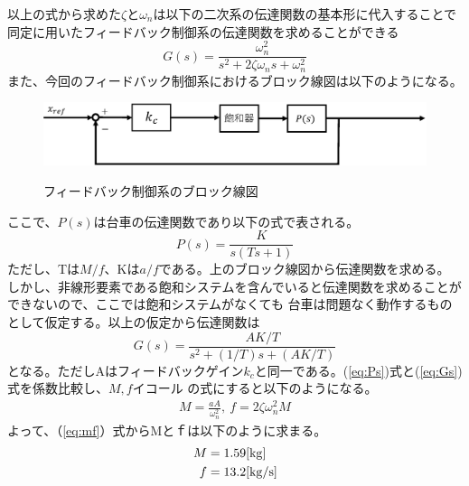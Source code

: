 		以上の式から求めた$\zeta$と$\omega_{n}$は以下の二次系の伝達関数の基本形に代入することで
		同定に用いたフィードバック制御系の伝達関数を求めることができる
		\begin{equation}
			G(s) = \frac{\omega_{n}^{2}}{s^{2}+2\zeta\omega_{n}s + \omega_{n}^{2}}
		\end{equation}
		また、今回のフィードバック制御系におけるブロック線図は以下のようになる。
		\begin{figure}[H]
			\centering
			\includegraphics[width=1.0\linewidth]{gazo/FeedBackCart.eps}\\
			\caption{フィードバック制御系のブロック線図}
			\label{image:FeedBackCart}
		\end{figure}
		ここで、$P(s)$は台車の伝達関数であり以下の式で表される。
		\begin{equation}
			P(s)=\frac{K}{s(Ts+1)}
			\label{eq:Ps}
		\end{equation}
		ただし、Tは$M/f$、Kは$a/f$である。上のブロック線図から伝達関数を求める。
		しかし、非線形要素である飽和システムを含んでいると伝達関数を求めることができないので、ここでは飽和システムがなくても
		台車は問題なく動作するものとして仮定する。以上の仮定から伝達関数は
		\begin{equation}
			G(s) = \frac{AK/T}{s^{2}+(1/T)s+(AK/T)}
			\label{eq:Gs}
		\end{equation}
		となる。ただしAはフィードバックゲイン$k_c$と同一である。(\ref{eq:Ps})式と(\ref{eq:Gs})式を係数比較し、$M,f$イコール
		の式にすると以下のようになる。
		\begin{equation}
			\left.
			\begin{array}{l}
				\displaystyle M=\frac{aA}{\omega_{n}^{2}} , \ f=2\zeta\omega_{n}^{2}M
			\end{array}
			\right.
			\label{eq:mf}
		\end{equation}
		よって、（\ref{eq:mf}）式からMとｆは以下のように求まる。
		\begin{align*}
			M&=1.59[\rm{kg}] \\
			f&=13.2[\rm{kg/s}]
		\end{align*}
		
